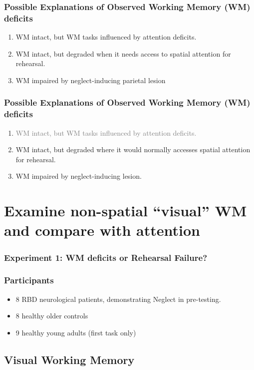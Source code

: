 \documentclass{beamer}
\begin{document}
\begin{frame}
	\frametitle{Possible Explanations of Observed Working Memory (WM) deficits}
	\begin{enumerate}
		\item WM intact, but WM tasks influenced by attention deficits.
		\item WM intact, but degraded when it needs access to spatial attention for rehearsal.
		\item WM impaired by neglect-inducing parietal lesion
	\end{enumerate}
\end{frame}

\begin{frame}
	\frametitle{Possible Explanations of Observed Working Memory (WM) deficits}
	\begin{enumerate}
		\item \textcolor{gray}{WM intact, but WM tasks influenced by attention deficits.}
		\item WM intact, but degraded where it would normally accesses spatial attention for rehearsal.
		\item WM impaired by neglect-inducing lesion.
	\end{enumerate}
\end{frame}


\section[Attention and WM]{Examine non-spatial ``visual'' WM and compare with attention}

\begin{frame}
	\frametitle{Experiment 1: WM deficits or Rehearsal Failure?}
		\tableofcontents[currentsection]
\end{frame}

\begin{frame}
\frametitle{Participants}
\begin{itemize}
	\item 8 RBD neurological patients, demonstrating Neglect in pre-testing.
	\item 8 healthy older controls
	\item 9 healthy young adults (first task only)
\end{itemize}
\end{frame}

\subsection*{Visual Working Memory}
\end{document}
